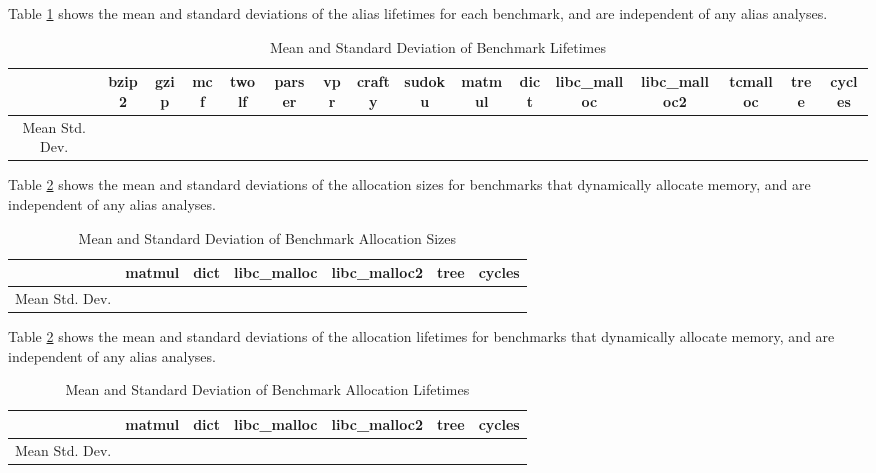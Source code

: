 Table \ref{table:4} shows the mean and standard deviations of the alias lifetimes for each benchmark, and are independent of any alias analyses.

\begin{table}
\centering
   \begin{tabular} {|c|c c c c c c c c c c c c c c c|}
      \hline
      & bzip2 & gzip & mcf & twolf & parser & vpr & crafty & sudoku & matmul & dict & libc_malloc & libc_malloc2 & tcmalloc & tree & cycles \\
      \hline
      Mean
      \hline
      Std. Dev.
      \hline
   \end{tabular}
   \caption{Mean and Standard Deviation of Benchmark Lifetimes}
   \label{table:4}
\end{table}

Table \ref{table:5} shows the mean and standard deviations of the allocation sizes for benchmarks that dynamically allocate memory, and are independent of any alias analyses.

\begin{table}
\centering
   \begin{tabular} {|c|c c c c c c|}
      \hline
      & matmul & dict & libc_malloc & libc_malloc2 & tree & cycles \\
      \hline
      Mean
      \hline
      Std. Dev.
      \hline
   \end{tabular}
   \caption{Mean and Standard Deviation of Benchmark Allocation Sizes}
   \label{table:5}
\end{table}

Table \ref{table:5} shows the mean and standard deviations of the allocation lifetimes for benchmarks that dynamically allocate memory, and are independent of any alias analyses.

\begin{table}
\centering
   \begin{tabular} {|c|c c c c c c|}
      \hline
      & matmul & dict & libc_malloc & libc_malloc2 & tree & cycles \\
      \hline
      Mean
      \hline
      Std. Dev.
      \hline
   \end{tabular}
   \caption{Mean and Standard Deviation of Benchmark Allocation Lifetimes}
   \label{table:6}
\end{table}
